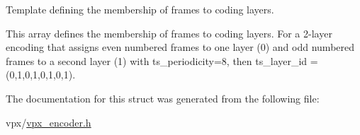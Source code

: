 Template defining the membership of frames to coding layers. 

This array defines the membership of frames to coding layers. For a 2-\/layer encoding that assigns even numbered frames to one layer (0) and odd numbered frames to a second layer (1) with ts\-\_\-periodicity=8, then ts\-\_\-layer\-\_\-id = (0,1,0,1,0,1,0,1). 

The documentation for this struct was generated from the following file\-:\begin{DoxyCompactItemize}
\item 
vpx/\hyperlink{vpx__encoder_8h}{vpx\-\_\-encoder.\-h}\end{DoxyCompactItemize}
